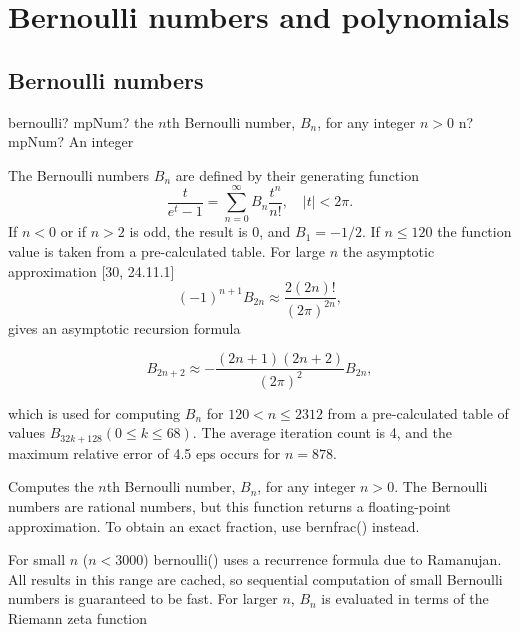 \newpage
\section{Bernoulli numbers and polynomials}
\label{BernoulliNumbersAndPolynomials}

\subsection{Bernoulli numbers}

\begin{mpFunctionsExtract}
	\mpFunctionOne
	{bernoulli? mpNum? the $n$th Bernoulli number, $B_n$, for any integer $n>0$}
	{n? mpNum? An integer}	
\end{mpFunctionsExtract}


\vspace{0.3cm}
The Bernoulli numbers $B_n$ are defined by their generating function
\begin{equation}
\frac{t}{e^t - 1} = \sum_{n=0}^{\infty} B_n \frac{t^n}{n!}, \quad |t| < 2\pi.
\end{equation}
If $n < 0$ or if $n > 2$ is odd, the result is 0, and $B_1 = -1/2$. If $n \leq 120$ the function value is taken from a pre-calculated table. For large $n$ the asymptotic  approximation [30, 24.11.1]
\begin{equation}
(-1)^{n+1} B_{2n} \approx \frac{2(2n)!}{(2\pi)^{2n}} ,
\end{equation}
gives an asymptotic recursion formula

\begin{equation}
B_{2n+2} \approx - \frac{(2n + 1)(2n + 2)}{(2\pi)^2} B_{2n},
\end{equation}

which is used for computing $B_n$ for $120 < n \leq 2312$ from a pre-calculated table of
values $B_{32k+128} (0 \leq  k \leq  68)$. The average iteration count is 4, and the maximum relative error of 4.5 eps occurs for $n = 878$.



Computes the $n$th Bernoulli number, $B_n$, for any integer $n>0$.
The Bernoulli numbers are rational numbers, but this function returns a floating-point approximation. To obtain an exact fraction, use  bernfrac() instead.

For small $n$ ($n<3000$) bernoulli() uses a recurrence formula due to Ramanujan. All results in this range are cached, so sequential computation of small Bernoulli numbers is guaranteed to be fast.
For larger $n$, $B_n$ is evaluated in terms of the Riemann zeta function




